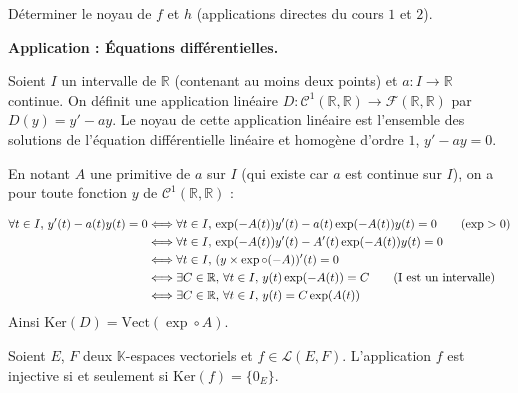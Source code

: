\documentclass[a4paper,10pt]{report}
\begin{document}
\begin{exa} Déterminer le noyau de $f$ et $h$ (applications directes du cours $1$ et $2$).
\end{exa}

\noindent \textbf{Application : Équations différentielles.}

\noindent Soient $I$ un intervalle de $\mathbb{R}$ (contenant au moins deux points) et $a : I \rightarrow \mathbb{R}$ continue. On définit une application linéaire $D : \mathcal{C}^1(\mathbb{R}, \mathbb{R}) \rightarrow \mathcal{F}(\mathbb{R}, \mathbb{R})$ par $D(y)=y'-ay$. Le noyau de cette application linéaire est l'ensemble des solutions de l'équation différentielle linéaire et homogène d'ordre $1$, $y'-ay=0$.

\medskip 

\noindent En notant $A$ une primitive de $a$ sur $I$ (qui existe car $a$ est continue sur $I$), on a pour toute fonction $y$ de $\mathcal{C}^1(\mathbb{R}, \mathbb{R})$ : 

\begin{align*}
\forall t \in I, \, y'(t)-a(t)y(t) =0& \Longleftrightarrow  \forall t \in I, \, \exp(-A(t))y'(t)- a(t)\exp(-A(t))y(t) = 0  \qquad (\exp >0)\\
 & \Longleftrightarrow  \forall t \in I, \, \exp(-A(t))y'(t)- A'(t)\exp(-A(t))y(t) = 0 \\
 & \Longleftrightarrow  \forall t \in I, \, (y \times \exp \circ (-A))'(t) = 0 \\
 & \Longleftrightarrow  \exists C \in \mathbb{R}, \,  \forall t \in I, \, y(t)  \exp (-A(t)) = C \qquad \hbox{(I est un intervalle)}\\
 & \Longleftrightarrow  \exists C \in \mathbb{R}, \,  \forall t \in I, \, y(t) = C \exp (A(t)) \\
\end{align*}
Ainsi $\textrm{Ker}(D) = \textrm{Vect}(\exp \circ A)$.

\begin{prop} Soient $E$, $F$ deux $\mathbb{K}$-espaces vectoriels et $f \in \mathcal{L}(E,F)$. L'application $f$ est injective si et seulement si $\textrm{Ker}(f) = \lbrace 0_E \rbrace$.
\end{prop}
\end{document}
